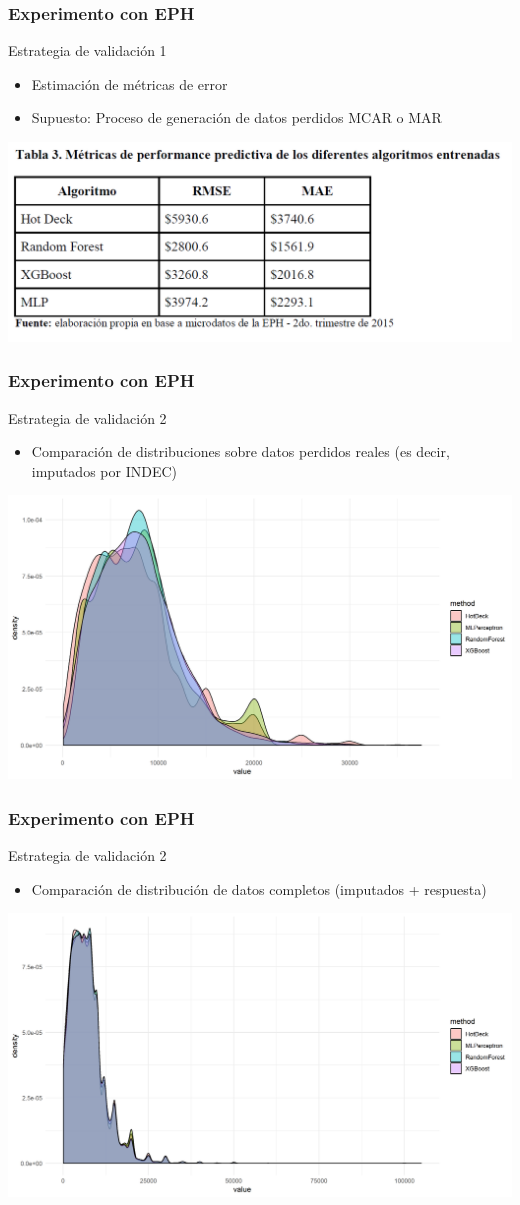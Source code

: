 \documentclass{beamer}
\begin{document}
\begin{frame}
\frametitle{Experimento con EPH}
Estrategia de validación 1
\begin{itemize}
	\item Estimación de métricas de error
	\item Supuesto: Proceso de generación de datos perdidos MCAR o MAR
\end{itemize}
\includegraphics[width=0.85\linewidth, height=0.5\textheight]{../img/val1}
\end{frame}

\begin{frame}
\frametitle{Experimento con EPH}
Estrategia de validación 2
\begin{itemize}
	\item Comparación de distribuciones sobre datos perdidos reales (es decir, imputados por INDEC)
\end{itemize}
\includegraphics[width=0.85\linewidth, height=0.5\textheight]{../img/density_imp}
\end{frame}

\begin{frame}
\frametitle{Experimento con EPH}
Estrategia de validación 2
\begin{itemize}
	\item Comparación de distribución de datos completos (imputados + respuesta)
\end{itemize}
\includegraphics[width=0.85\linewidth, height=0.5\textheight]{../img/density_comp}
\end{frame}
\end{document}
